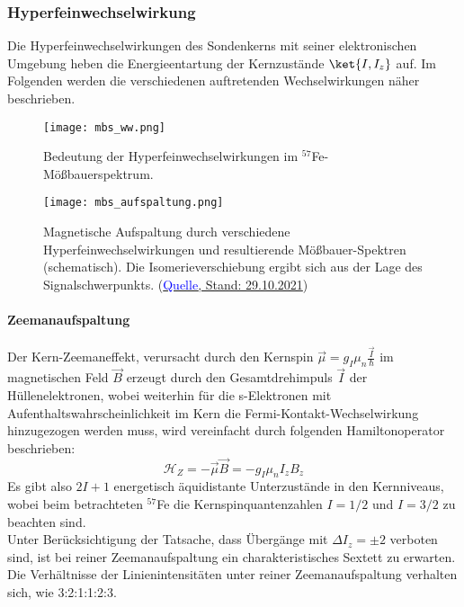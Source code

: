 \documentclass[german,  %
parskip=full,  %
headsepline]{scrartcl}
\begin{document}
\subsubsection{Hyperfeinwechselwirkung}
Die Hyperfeinwechselwirkungen des Sondenkerns mit seiner elektronischen Umgebung heben die Energieentartung der Kernzustände $\ket{I,I_z}$ auf. Im Folgenden werden die verschiedenen auftretenden Wechselwirkungen näher beschrieben.
\begin{figure}[htp!]
    \centering
    \texttt{[image: mbs\_ww.png]}
    \caption{Bedeutung der Hyperfeinwechselwirkungen im $^{57}$Fe-Mößbauerspektrum.}
    \label{fig:ww}
\end{figure}
\begin{figure}[htp!]
    \centering
    \texttt{[image: mbs\_aufspaltung.png]}
    \caption{Magnetische Aufspaltung durch verschiedene Hyperfeinwechselwirkungen und resultierende  Mößbauer-Spektren  (schematisch). Die Isomerieverschiebung ergibt sich aus der Lage des Signalschwerpunkts. (\href{https://www.uni-muenster.de/imperia/md/content/physikalische_chemie/app_moess.pdf}{\textcolor{blue}{Quelle}, Stand: 29.10.2021})}
    \label{fig:aufspaltung}
\end{figure}


\paragraph{Zeemanaufspaltung}
Der Kern-Zeemaneffekt, verursacht durch den Kernspin $\Vec{\mu}=g_I\mu_n\frac{\Vec{I}}{\hbar}$ im magnetischen Feld $\Vec{B}$ erzeugt durch den Gesamtdrehimpuls $\Vec{I}$ der Hüllenelektronen, wobei weiterhin für die s-Elektronen mit Aufenthaltswahrscheinlichkeit im Kern die Fermi-Kontakt-Wechselwirkung hinzugezogen werden muss, wird vereinfacht durch folgenden Hamiltonoperator beschrieben:
\begin{equation}
    \mathcal{H}_Z = -\Vec{\mu}\Vec{B}=-g_I\mu_nI_zB_z
\end{equation}
\label{zeeman}
Es gibt also $2I+1$ energetisch äquidistante Unterzustände in den Kernniveaus, wobei beim betrachteten $^{57}$Fe die Kernspinquantenzahlen $I=1/2$ und $I=3/2$ zu beachten sind.\\
Unter Berücksichtigung der Tatsache, dass Übergänge mit $\Delta I_z=\pm2$ verboten sind, ist bei reiner Zeemanaufspaltung ein charakteristisches Sextett zu erwarten.\\
Die Verhältnisse der Linienintensitäten unter reiner Zeemanaufspaltung verhalten sich, wie 3:2:1:1:2:3.
\end{document}
